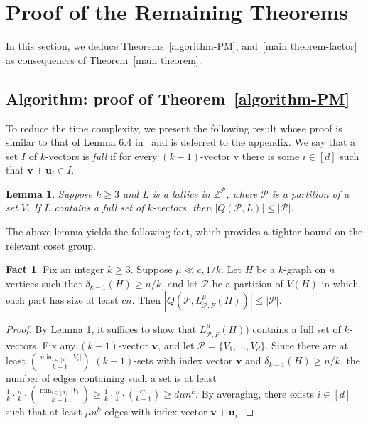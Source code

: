 \documentclass[11pt, letterpaper]{amsart}
\theoremstyle{plain}
\numberwithin{equation}{section}
\newtheorem{lemma}[thm]{Lemma}
\theoremstyle{definition}
\newtheorem{fact}[thm]{Fact}
\newcommand\card[1]{\left| #1 \right|}
\renewcommand{\vec}[1]{{\mathbf #1}}
\begin{document}
     
     \section{Proof of the Remaining Theorems}\label{sec:remaining theorems}
     In this section, we deduce Theorems~\ref{algorithm-PM}, and~\ref{main theorem-factor} as consequences of Theorem~\ref{main theorem}.

     \subsection{Algorithm: proof of Theorem~\ref{algorithm-PM}}
To reduce the time complexity, we present the following result whose proof is similar to that of Lemma 6.4 in~\cite{keevash2013polynomial} and is deferred to the appendix. We say that a set \(I\) of \(k\)-vectors is \emph{full} if for every \((k-1)\)-vector v there is some \( i\in[d]\) such that \(\vec{v}+\vec{u_i}\in I\). 
\begin{lemma}\label{card-PM}
    Suppose $k\ge 3$ and $L$ is a lattice in $\mathbb{Z}^{\mathcal{P}}$, where $\mathcal{P}$ is a partition of a set $V$. If $L$ contains a full set of $k$-vectors, then $\card{Q(\mathcal{P},L)}\le \card{\mathcal{P}}.$
\end{lemma}
The above lemma yields the following fact, which provides a tighter bound on the relevant coset group. 
\begin{fact}\label{fact:coset group}
    Fix an integer \(k\ge 3\). Suppose \(\mu \ll c,1/k\). Let \(H\) be a \(k\)-graph on \(n\) vertices such that \(\delta_{k-1}(H)\ge n/k\), and let \(\mathcal{P}\) be a partition of \(V(H)\) in which each part has size at least \(cn\). Then \(|Q(\mathcal{P},L_{\mathcal{P},F}^{\mu}(H))|\le \card{\mathcal{P}}\).
\end{fact}
\begin{proof}
    By Lemma \ref{card-PM}, it suffices to show that $L_{\mathcal{P},F}^{\mu}(H))$ contains a full set of $k$-vectors. 
    Fix any \((k-1)\)-vector \(\vec{v}\), and let \(\mathcal{P}=\{V_1,\dots,V_d\}\). Since there are at least \(\binom{\min_{i\in [d]}|V_i|}{k-1}\) \((k-1)\)-sets with index vector \(\vec{v}\) and \(\delta_{k-1}(H)\ge n/k\), the number of edges containing such a set is at least \(\frac{1}{k}\cdot \frac{n}{k}\cdot\binom{\min_{i\in [d]}|V_i|}{k-1}\ge \frac{1}{k}\cdot \frac{n}{k}\cdot\binom{cn}{k-1}\ge d\mu n^k\). By averaging, there exists \(i\in [d]\) such that at least \(\mu n^k\) edges with index vector \(\vec{v}+\vec{u}_i\). 
\end{proof}
\end{document}
